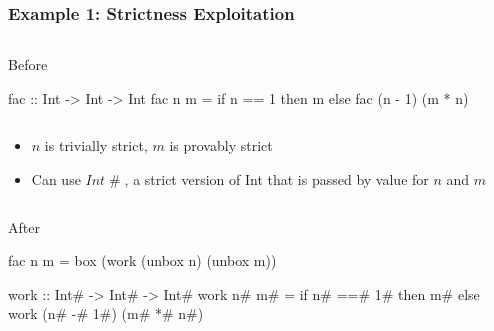 \documentclass[smaller]{beamer}
\newcommand{\Conid}[1]{\mathit{#1}}
\newcommand{\Varid}[1]{\mathit{#1}}
\begin{document}
\begin{frame}[fragile]
\frametitle{Example 1: Strictness Exploitation}

\begin{columns}[t]
\begin{column}{0.8\textwidth}
\begin{block}{Before}
{\footnotesize\begin{semiverbatim}
\alert{fac :: Int -> Int -> Int}
fac n m = if n == 1
          then m
          else fac (n - 1) (m * n)
\end{semiverbatim}}
\end{block}
\end{column}
\end{columns}

\vskip 0.2in
\begin{itemize}
\item \ensuremath{\Varid{n}} is trivially strict, \ensuremath{\Varid{m}} is provably strict
\item Can use \ensuremath{\Conid{Int}\mathbin{\#}}, a strict version of Int that is passed by value for \ensuremath{\Varid{n}} and \ensuremath{\Varid{m}}
\end{itemize}
\begin{columns}[t]
\begin{column}{0.8\textwidth}
\begin{block}{After}
{\footnotesize\begin{semiverbatim}
fac n m = box (work (unbox n) (unbox m))

\alert{work :: Int# -> Int# -> Int#}
work n# m# = if n# ==# 1#
            then m#
            else work (n# -# 1#) (m# *# n#)
\end{semiverbatim}}
\end{block}
\end{column}
\end{columns}

\end{frame}
\end{document}
